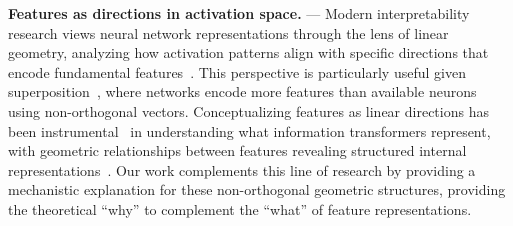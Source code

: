 \textbf{Features as directions in activation space.}
---
%
%
Modern interpretability research views neural network representations through the lens of linear geometry, analyzing how activation patterns align with specific directions that encode fundamental features~\cite{park2024linearrepresentationhypothesisgeometry}. This perspective is particularly useful given superposition~\cite{elhage2022superposition}, where networks encode more features than available neurons using non-orthogonal vectors. Conceptualizing features as linear directions has been instrumental~\cite{cunningham2023sae, bricken2023monosemanticity, templeton2024scaling} in understanding what information transformers represent, with geometric relationships between features revealing structured internal representations~\cite{Engels24_Not}. Our work complements this line of research by providing a mechanistic explanation for these non-orthogonal geometric structures, providing the theoretical ``why'' to complement the ``what'' of feature representations.

